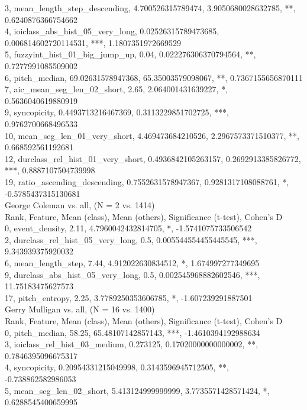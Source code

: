 3, mean_length_step_descending, 4.700526315789474, 3.9050680028632785, **, 0.6240876366754662\\
4, ioiclass_abs_hist_05_very_long, 0.02526315789473685, 0.006814602720114531, ***, 1.1807351972669529\\
5, fuzzyint_hist_01_big_jump_up, 0.04, 0.022276306370794564, **, 0.7277991085509002\\
6, pitch_median, 69.02631578947368, 65.35003579098067, **, 0.7367155656870111\\
7, aic_mean_seg_len_02_short, 2.65, 2.064001431639227, *, 0.5636040619880919\\
9, syncopicity, 0.4493713216467369, 0.3113229851702725, ***, 0.9762700668496533\\
10, mean_seg_len_01_very_short, 4.469473684210526, 2.2967573371510377, **, 0.668592561192681\\
12, durclass_rel_hist_01_very_short, 0.4936842105263157, 0.2692913385826772, ***, 0.8887107504739998\\
19, ratio_ascending_descending, 0.7552631578947367, 0.9281317108088761, *, -0.5785437315130681\\
George Coleman vs. all, (N = 2 vs. 1414)\\
Rank, Feature, Mean (class), Mean (others), Significance (t-test), Cohen's D\\
0, event_density, 2.11, 4.7960042432814705, *, -1.5741075733506542\\
2, durclass_rel_hist_05_very_long, 0.5, 0.005544554455445545, ***, 9.343939375920032\\
6, mean_length_step, 7.44, 4.912022630834512, *, 1.674997277349695\\
9, durclass_abs_hist_05_very_long, 0.5, 0.002545968882602546, ***, 11.75183475627573\\
17, pitch_entropy, 2.25, 3.7789250353606785, *, -1.607239291887501\\
Gerry Mulligan vs. all, (N = 16 vs. 1400)\\
Rank, Feature, Mean (class), Mean (others), Significance (t-test), Cohen's D\\
0, pitch_median, 58.25, 65.48107142857143, ***, -1.4610394192988634\\
3, ioiclass_rel_hist_03_medium, 0.273125, 0.17020000000000002, **, 0.7846395096675317\\
4, syncopicity, 0.20954331215049998, 0.3143596945712505, **, -0.738862582986053\\
5, mean_seg_len_02_short, 5.413124999999999, 3.7735571428571424, *, 0.6288545400659995\\
